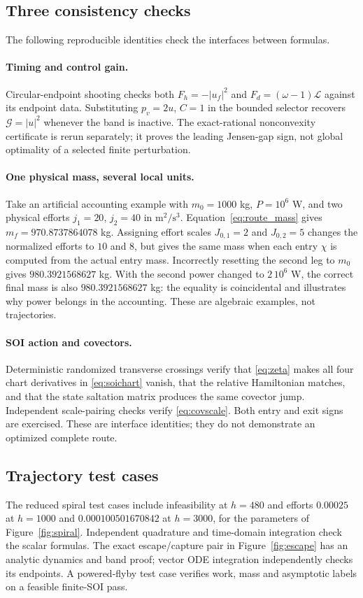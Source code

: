 \subsection{Three consistency checks}
The following reproducible identities check the interfaces between formulas.

\paragraph{Timing and control gain.}
Circular-endpoint shooting checks both
$F_h=-|u_f|^2$ and $F_d=(\omega-1)\mathcal L$ against its endpoint
data. Substituting $p_v=2u$, $C=1$ in the bounded selector recovers
$\mathcal G=|u|^2$ whenever the band is inactive. The exact-rational
nonconvexity certificate is rerun separately; it proves the leading
Jensen-gap sign, not global optimality of a selected finite perturbation.

\paragraph{One physical mass, several local units.}
Take an artificial accounting example with $m_0=1000$ kg, $P=10^6$ W,
and two physical efforts $j_1=20$, $j_2=40$ in
$\mathrm{m^2/s^3}$. Equation~\eqref{eq:route_mass} gives
$m_f=970.8737864078$ kg.
Assigning effort scales $J_{0,1}=2$ and $J_{0,2}=5$ changes the
normalized efforts to $10$ and $8$, but gives the same mass when each
entry $\chi$ is computed from the actual entry mass. Incorrectly
resetting the second leg to $m_0$ gives $980.3921568627$ kg.
With the second power changed to $2\,10^6$ W, the correct final mass
is also $980.3921568627$ kg: the equality is coincidental and illustrates
why power belongs in the accounting. These are algebraic examples,
not trajectories.

\paragraph{SOI action and covectors.}
Deterministic randomized transverse crossings verify that
\eqref{eq:zeta} makes all four chart derivatives in
\eqref{eq:soichart} vanish, that the relative Hamiltonian matches,
and that the state saltation matrix produces the same covector jump.
Independent scale-pairing checks verify \eqref{eq:covscale}.
Both entry and exit signs are exercised. These are interface identities;
they do not demonstrate an optimized complete route.

\subsection{Trajectory test cases}
The reduced spiral test cases include infeasibility at $h=480$ and
efforts $0.00025$ at $h=1000$ and
$0.000100501670842$ at $h=3000$, for the parameters of
Figure~\ref{fig:spiral}. Independent quadrature and time-domain
integration check the scalar formulas. The exact escape/capture pair
in Figure~\ref{fig:escape} has an analytic dynamics and band proof;
vector ODE integration independently checks its endpoints.
A powered-flyby test case verifies work, mass and asymptotic labels
on a feasible finite-SOI pass.

